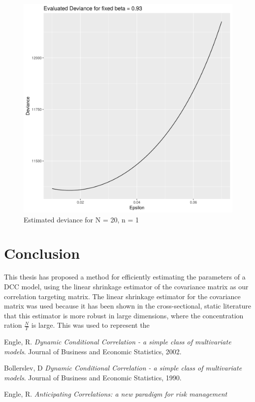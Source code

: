 \documentclass{article} %
\numberwithin{equation}{section} %
\numberwithin{figure}{section} %
\numberwithin{table}{section} %
\begin{document}
\begin{figure}[h]
\begin{center}
\includegraphics[scale = 0.5]{loglik3.png}
\caption{Estimated deviance for N = 20, n = 1}
\end{center}
\end{figure}

\FloatBarrier


\section{Conclusion}

This thesis has proposed a method for efficiently estimating the parameters of a DCC model, using the linear shrinkage estimator of the covariance matrix as our correlation targeting matrix. The linear shrinkage estimator for the covariance matrix was used because it has been shown in the cross-sectional, static literature that this estimator is more robust in large dimensions, where the concentration ration $\frac{N}{T}$ is large. This was used to represent the

\pagebreak

\begin{thebibliography}{9}
Engle, R.
\textit{Dynamic Conditional Correlation - a simple class of multivariate models}.
Journal of Business and Economic Statistics, 2002.

Bollerslev, D
\textit{Dynamic Conditional Correlation - a simple class of multivariate models}.
Journal of Business and Economic Statistics, 1990.

Engle, R.
\textit{Anticipating Correlations: a new paradigm for risk management}
\end{thebibliography}
\end{document}
